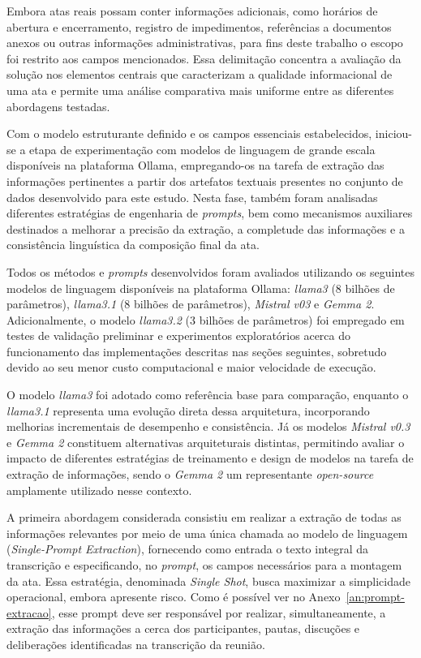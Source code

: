 Embora atas reais possam conter informações adicionais, como horários de abertura e encerramento, registro de impedimentos, referências a documentos anexos ou outras informações administrativas, para fins deste trabalho o escopo foi restrito aos campos mencionados. Essa delimitação concentra a avaliação da solução nos elementos centrais que caracterizam a qualidade informacional de uma ata e permite uma análise comparativa mais uniforme entre as diferentes abordagens testadas.

Com o modelo estruturante definido e os campos essenciais estabelecidos, iniciou-se a etapa de experimentação com modelos de linguagem de grande escala disponíveis na plataforma Ollama, empregando-os na tarefa de extração das informações pertinentes a partir dos artefatos textuais presentes no conjunto de dados desenvolvido para este estudo. Nesta fase, também foram analisadas diferentes estratégias de engenharia de \textit{prompts}, bem como mecanismos auxiliares destinados a melhorar a precisão da extração, a completude das informações e a consistência linguística da composição final da ata.

Todos os métodos e \textit{prompts} desenvolvidos foram avaliados utilizando os seguintes modelos de linguagem disponíveis na plataforma Ollama: \textit{llama3} (8 bilhões de parâmetros), \textit{llama3.1} (8 bilhões de parâmetros), \textit{Mistral v03} e \textit{Gemma 2}. Adicionalmente, o modelo \textit{llama3.2} (3 bilhões de parâmetros) foi empregado em testes de validação preliminar e experimentos exploratórios acerca do funcionamento das implementações descritas nas seções seguintes, sobretudo devido ao seu menor custo computacional e maior velocidade de execução.

O modelo \textit{llama3} foi adotado como referência base para comparação, enquanto o \textit{llama3.1} representa uma evolução direta dessa arquitetura, incorporando melhorias incrementais de desempenho e consistência. Já os modelos \textit{Mistral v0.3} e \textit{Gemma 2} constituem alternativas arquiteturais distintas, permitindo avaliar o impacto de diferentes estratégias de treinamento e design de modelos na tarefa de extração de informações, sendo o \textit{Gemma 2} um representante \textit{open-source} amplamente utilizado nesse contexto.

A primeira abordagem considerada consistiu em realizar a extração de todas as informações relevantes por meio de uma única chamada ao modelo de linguagem (\textit{Single-Prompt Extraction}), fornecendo como entrada o texto integral da transcrição e especificando, no \textit{prompt}, os campos necessários para a montagem da ata. Essa estratégia, denominada \textit{Single Shot}, busca maximizar a simplicidade operacional, embora apresente risco. Como é possível ver no Anexo~\ref{an:prompt-extracao}, esse prompt deve ser responsável por realizar, simultaneamente, a extração das informações a cerca dos participantes, pautas, discuções e deliberações identificadas na transcrição da reunião.

